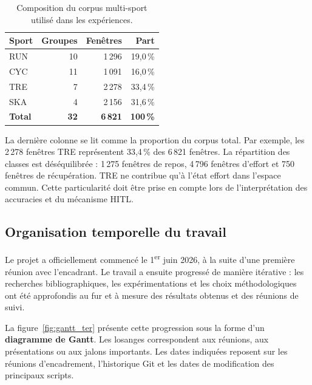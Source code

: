 \documentclass[12pt,a4paper]{article}
\begin{document}
\begin{table}[H]
\centering
\caption{Composition du corpus multi-sport utilisé dans les expériences.}
\label{tab:corpus_multisport}
\begin{tabular}{lrrr}
\toprule
\textbf{Sport} & \textbf{Groupes} & \textbf{Fenêtres} & \textbf{Part} \\
\midrule
RUN & 10 & 1\,296 & 19,0\,\% \\
CYC & 11 & 1\,091 & 16,0\,\% \\
TRE & 7  & 2\,278 & 33,4\,\% \\
SKA & 4  & 2\,156 & 31,6\,\% \\
\midrule
\textbf{Total} & \textbf{32} & \textbf{6\,821} & \textbf{100\,\%} \\
\bottomrule
\end{tabular}
\end{table}

La dernière colonne se lit comme la proportion du corpus total. Par exemple,
les 2\,278 fenêtres TRE représentent 33,4\,\% des 6\,821 fenêtres. La
répartition des classes est déséquilibrée : 1\,275 fenêtres de repos,
4\,796 fenêtres d'effort et 750 fenêtres de récupération. TRE ne contribue
qu'à l'état effort dans l'espace commun. Cette particularité doit être prise
en compte lors de l'interprétation des accuracies et du mécanisme HITL.

\subsection{Organisation temporelle du travail}
\label{subsec:organisation_temporelle}

Le projet a officiellement commencé le 1\textsuperscript{er} juin 2026,
à la suite d'une première réunion avec l'encadrant. Le travail a ensuite
progressé de manière itérative : les recherches bibliographiques, les
expérimentations et les choix méthodologiques ont été approfondis au fur et à
mesure des résultats obtenus et des réunions de suivi.

La figure~\ref{fig:gantt_ter} présente cette progression sous la forme d'un
\textbf{diagramme de Gantt}. Les losanges correspondent aux réunions, aux présentations ou aux
jalons importants. Les dates indiquées reposent sur les réunions
d'encadrement, l'historique Git et les dates de modification des principaux
scripts.
\end{document}

